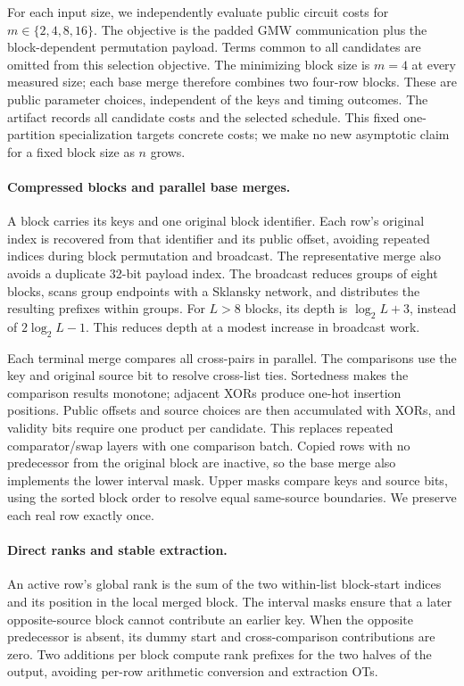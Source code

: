 For each input size, we independently evaluate public circuit costs for
$m\in\{2,4,8,16\}$. The objective is the padded GMW communication plus the
block-dependent permutation payload. Terms common to all candidates are omitted
from this selection objective. The minimizing block size is $m=4$ at every
measured size; each base merge therefore combines two four-row blocks.
These are public parameter choices, independent of the keys and timing outcomes.
The artifact records all candidate costs and the selected schedule.
This fixed one-partition specialization targets concrete costs; we make no
new asymptotic claim for a fixed block size as $n$ grows.

\paragraph{Compressed blocks and parallel base merges.}
A block carries its keys and one original block identifier.
Each row's original index is recovered from that identifier and its public
offset, avoiding repeated indices during block permutation and broadcast.
The representative merge also avoids a duplicate 32-bit payload index.
The broadcast reduces groups of eight blocks, scans group endpoints with a
Sklansky network, and distributes the resulting prefixes within groups.
For $L>8$ blocks, its depth is $\log_2 L+3$, instead of $2\log_2 L-1$.
This reduces depth at a modest increase in broadcast work.

Each terminal merge compares all cross-pairs in parallel.
The comparisons use the key and original source bit to resolve cross-list ties.
Sortedness makes the comparison results monotone; adjacent XORs produce one-hot
insertion positions. Public offsets and source choices are then accumulated
with XORs, and validity bits require one product per candidate.
This replaces repeated comparator/swap layers with one comparison batch.
Copied rows with no predecessor from the original block are inactive, so the
base merge also implements the lower interval mask.
Upper masks compare keys and source bits, using the sorted block order to
resolve equal same-source boundaries. We preserve each real row exactly once.

\paragraph{Direct ranks and stable extraction.}
An active row's global rank is the sum of the two within-list block-start
indices and its position in the local merged block.
The interval masks ensure that a later opposite-source block cannot contribute
an earlier key. When the opposite predecessor is absent, its dummy start and
cross-comparison contributions are zero. Two additions per block compute rank
prefixes for the two halves of the output, avoiding per-row arithmetic conversion
and extraction OTs.

